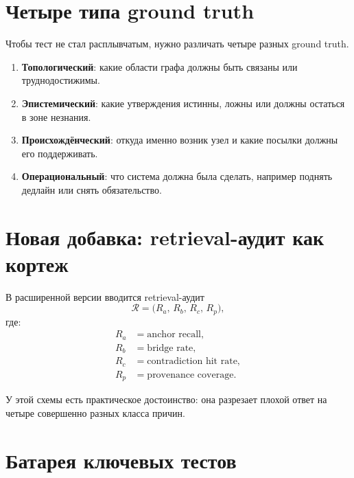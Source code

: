 \section{Четыре типа ground truth}

Чтобы тест не стал расплывчатым, нужно различать четыре разных ground truth.
\begin{enumerate}
\item \textbf{Топологический}: какие области графа должны быть связаны или труднодостижимы.
\item \textbf{Эпистемический}: какие утверждения истинны, ложны или должны остаться в зоне незнания.
\item \textbf{Происхождёнческий}: откуда именно возник узел и какие посылки должны его поддерживать.
\item \textbf{Операциональный}: что система должна была сделать, например поднять дедлайн или снять обязательство.
\end{enumerate}

\section{Новая добавка: retrieval-аудит как кортеж}

В расширенной версии вводится retrieval-аудит
\[
\mathcal{R}
=
\bigl(
R_a,\,
R_b,\,
R_c,\,
R_p
\bigr),
\]
где:
\begin{align*}
R_a &= \text{anchor recall},\\
R_b &= \text{bridge rate},\\
R_c &= \text{contradiction hit rate},\\
R_p &= \text{provenance coverage}.
\end{align*}

У этой схемы есть практическое достоинство: она разрезает плохой ответ на четыре
совершенно разных класса причин.

\section{Батарея ключевых тестов}

